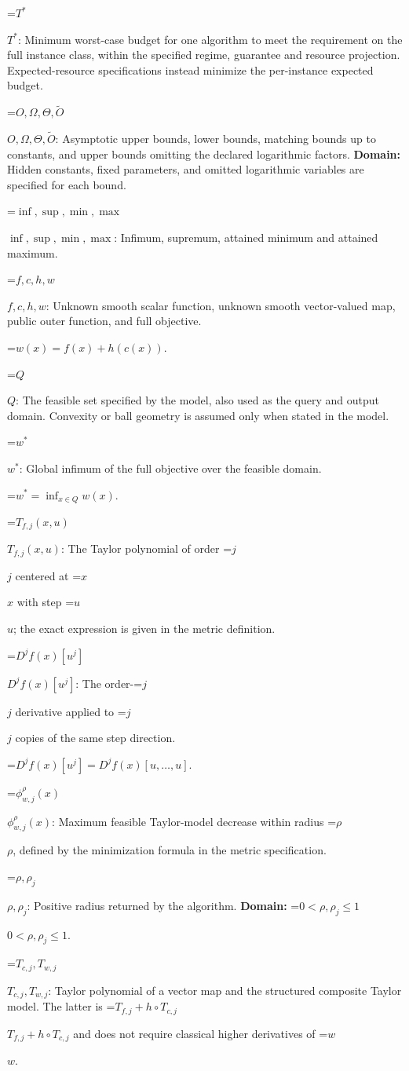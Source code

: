 \documentclass[10pt,a4paper]{article}
\newcommand{\AtlasMath}[1]{\par\begingroup\centering\setbox0=\hbox{$\displaystyle #1$}\ifdim\wd0>1.4\linewidth\typeout{ATLAS WIDE FORMULA: \the\wd0}\fi\ifdim\wd0>\linewidth\resizebox{\linewidth}{!}{\box0}\else\box0\fi\par\endgroup}
\newcommand{\AtlasInlineMath}[1]{\begingroup\setbox0=\hbox{$#1$}\ifdim\wd0>.4\linewidth\endgroup\AtlasMath{#1}\else\endgroup$#1$\fi}
\begin{document}
\AtlasInlineMath{T^*}: Minimum worst-case budget for one algorithm to meet the requirement on the full instance class, within the specified regime, guarantee and resource projection. Expected-resource specifications instead minimize the per-instance expected budget.

\AtlasInlineMath{O,\Omega,\Theta,\widetilde{O}}: Asymptotic upper bounds, lower bounds, matching bounds up to constants, and upper bounds omitting the declared logarithmic factors. \textbf{Domain:} Hidden constants, fixed parameters, and omitted logarithmic variables are specified for each bound.

\AtlasInlineMath{\inf,\sup,\min,\max}: Infimum, supremum, attained minimum and attained maximum.

\AtlasInlineMath{f,c,h,w}: Unknown smooth scalar function, unknown smooth vector-valued map, public outer function, and full objective.


\AtlasMath{w(x)=f(x)+h(c(x)).}


\AtlasInlineMath{Q}: The feasible set specified by the model, also used as the query and output domain. Convexity or ball geometry is assumed only when stated in the model.

\AtlasInlineMath{w^*}: Global infimum of the full objective over the feasible domain.


\AtlasMath{w^*=\inf_{x\in Q}w(x).}


\AtlasInlineMath{T_{f,j}(x,u)}: The Taylor polynomial of order \AtlasInlineMath{j} centered at \AtlasInlineMath{x} with step \AtlasInlineMath{u}; the exact expression is given in the metric definition.

\AtlasInlineMath{D^jf(x)[u^j]}: The order-\AtlasInlineMath{j} derivative applied to \AtlasInlineMath{j} copies of the same step direction.


\AtlasMath{D^jf(x)[u^j]=D^jf(x)[u,\ldots,u].}


\AtlasInlineMath{\phi_{w,j}^{\rho}(x)}: Maximum feasible Taylor-model decrease within radius \AtlasInlineMath{\rho}, defined by the minimization formula in the metric specification.

\AtlasInlineMath{\rho,\rho_j}: Positive radius returned by the algorithm. \textbf{Domain:} \AtlasInlineMath{0<\rho,\rho_j\le1}.

\AtlasInlineMath{T_{c,j},T_{w,j}}: Taylor polynomial of a vector map and the structured composite Taylor model. The latter is \AtlasInlineMath{T_{f,j}+h\circ T_{c,j}} and does not require classical higher derivatives of \AtlasInlineMath{w}.
\end{document}
